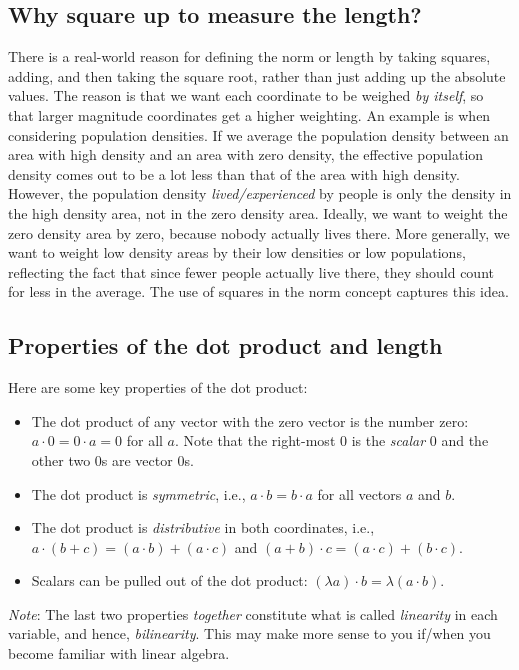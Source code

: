 \documentclass[10pt]{amsart}
\begin{document}
\subsection{Why square up to measure the length?}

There is a real-world reason for defining the norm or length by taking
squares, adding, and then taking the square root, rather than just
adding up the absolute values. The reason is that we want each
coordinate to be weighed {\em by itself}, so that larger magnitude
coordinates get a higher weighting. An example is when considering
population densities. If we average the population density between an
area with high density and an area with zero density, the effective
population density comes out to be a lot less than that of the area
with high density. However, the population density {\em
lived/experienced} by people is only the density in the high density
area, not in the zero density area. Ideally, we want to weight the
zero density area by zero, because nobody actually lives there. More
generally, we want to weight low density areas by their low densities
or low populations, reflecting the fact that since fewer people
actually live there, they should count for less in the average. The
use of squares in the norm concept captures this idea.

\subsection{Properties of the dot product and length}

Here are some key properties of the dot product:

\begin{itemize}
\item The dot product of any vector with the zero vector is the number
  zero: $a \cdot 0 = 0 \cdot a = 0$ for all $a$. Note that the
  right-most $0$ is the {\em scalar} $0$ and the other two $0$s are
  vector $0$s.
\item The dot product is {\em symmetric}, i.e., $a \cdot b = b \cdot
  a$ for all vectors $a$ and $b$.
\item The dot product is {\em distributive} in both coordinates, i.e.,
  $a \cdot (b + c) = (a \cdot b) + (a \cdot c)$ and $(a + b) \cdot c =
  (a \cdot c) + (b \cdot c)$.
\item Scalars can be pulled out of the dot product: $(\lambda a) \cdot
  b = \lambda(a \cdot b)$.
\end{itemize}

{\em Note}: The last two properties {\em together} constitute what is
called {\em linearity} in each variable, and hence, {\em
bilinearity}. This may make more sense to you if/when you become
familiar with linear algebra.
\end{document}

